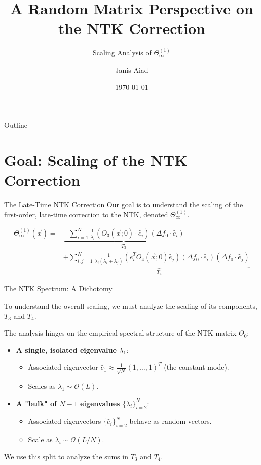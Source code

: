 \documentclass{beamer}
\title{A Random Matrix Perspective on the NTK Correction}
\subtitle{Scaling Analysis of $\Theta^{(1)}_\infty$}
\author{Janis Aiad}
\institute{UMD, Ecole Polytechnique}
\date{\today}
\newcommand{\Order}{\mathcal{O}}
\begin{document}
\begin{frame}
\titlepage
\end{frame}

\begin{frame}{Outline}
\tableofcontents
\end{frame}

\section{Goal: Scaling of the NTK Correction}

\begin{frame}{The Late-Time NTK Correction}
Our goal is to understand the scaling of the first-order, late-time correction to the NTK, denoted $\Theta^{(1)}_\infty$.
\begin{theorem}
\begin{align*}
\Theta^{(1)}_\infty(\vec{x}) = & \underbrace{-\sum_{i=1}^N \frac{1}{\lambda_{i}}(O_{3}(\vec{x};0)\cdot\hat{e}_{i})(\Delta f_{0}\cdot\hat{e}_{i})}_{T_3} \\
& + \underbrace{\sum_{i,j=1}^N\frac{1}{\lambda_{i}(\lambda_{i}+\lambda_{j})}(\hat{e}_{i}^{T}O_{4}(\vec{x};0)\hat{e}_{j})(\Delta f_{0}\cdot \hat{e}_{i})(\Delta f_{0}\cdot \hat{e}_{j})}_{T_4}
\end{align*}
\end{theorem}
\vfill

\end{frame}

\begin{frame}{The NTK Spectrum: A Dichotomy}
    \begin{center}
        To understand the overall scaling, we must analyze the scaling of its components, $T_3$ and $T_4$.
    \end{center}

The analysis hinges on the empirical spectral structure of the NTK matrix $\Theta_0$:
\begin{itemize}
    \item \textbf{A single, isolated eigenvalue $\lambda_1$}:
    \begin{itemize}
        \item Associated eigenvector $\hat{e}_1 \approx \frac{1}{\sqrt{N}}(1, \dots, 1)^T$ (the constant mode).
        \item Scales as $\lambda_1 \sim \Order(L)$.
    \end{itemize}
    \item \textbf{A "bulk" of $N-1$ eigenvalues $\{\lambda_i\}_{i=2}^N$}:
    \begin{itemize}
        \item Associated eigenvectors $\{\hat{e}_i\}_{i=2}^N$ behave as random vectors.
        \item Scale as $\lambda_i \sim \Order(L/N)$.
    \end{itemize}
\end{itemize}
\vspace{1cm}
We use this split to analyze the sums in $T_3$ and $T_4$.
\end{frame}
\end{document}
